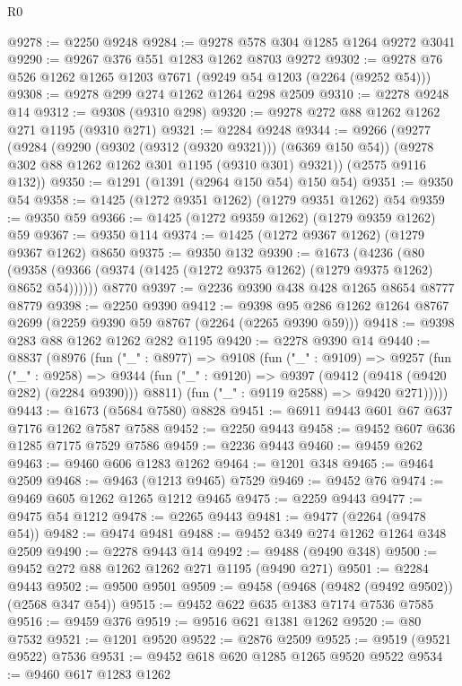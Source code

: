 \begin{lexlean}{R0}
\begin{coremodule}
@9278 := @2250 @9248
@9284 := @9278 @578 @304 @1285 @1264 @9272 @3041
@9290 := @9267 @376 @551 @1283 @1262 @8703 @9272
@9302 := @9278 @76 @526 @1262 @1265 @1203 @7671 (@9249 @54 @1203 (@2264 (@9252 @54)))
@9308 := @9278 @299 @274 @1262 @1264 @298 @2509
@9310 := @2278 @9248 @14
@9312 := @9308 (@9310 @298)
@9320 := @9278 @272 @88 @1262 @1262 @271 @1195 (@9310 @271)
@9321 := @2284 @9248
@9344 := @9266
    (@9277
      (@9284
        (@9290 (@9302 (@9312 (@9320 @9321))) (@6369 @150 @54))
        (@9278 @302 @88 @1262 @1262 @301 @1195 (@9310 @301) @9321))
      (@2575 @9116 @132))
@9350 := @1291 (@1391 (@2964 @150 @54) @150 @54)
@9351 := @9350 @54
@9358 := @1425 (@1272 @9351 @1262) (@1279 @9351 @1262) @54
@9359 := @9350 @59
@9366 := @1425 (@1272 @9359 @1262) (@1279 @9359 @1262) @59
@9367 := @9350 @114
@9374 := @1425 (@1272 @9367 @1262) (@1279 @9367 @1262) @8650
@9375 := @9350 @132
@9390 := @1673
    (@4236 (@80 (@9358 (@9366 (@9374 (@1425 (@1272 @9375 @1262) (@1279 @9375 @1262) @8652 @54))))))
    @8770
@9397 := @2236 @9390 @438 @428 @1265 @8654 @8777 @8779
@9398 := @2250 @9390
@9412 := @9398 @95 @286 @1262 @1264 @8767 @2699 (@2259 @9390 @59 @8767 (@2264 (@2265 @9390 @59)))
@9418 := @9398 @283 @88 @1262 @1262 @282 @1195
@9420 := @2278 @9390 @14
@9440 := @8837
    (@8976
      (fun ("_" : @8977) =>
      @9108
        (fun ("_" : @9109) =>
        @9257
          (fun ("_" : @9258) =>
          @9344
            (fun ("_" : @9120) => @9397 (@9412 (@9418 (@9420 @282) (@2284 @9390))) @8811)
            (fun ("_" : @9119 @2588) => @9420 @271)))))
@9443 := @1673 (@5684 @7580) @8828
@9451 := @6911 @9443 @601 @67 @637 @7176 @1262 @7587 @7588
@9452 := @2250 @9443
@9458 := @9452 @607 @636 @1285 @7175 @7529 @7586
@9459 := @2236 @9443
@9460 := @9459 @262
@9463 := @9460 @606 @1283 @1262
@9464 := @1201 @348
@9465 := @9464 @2509
@9468 := @9463 (@1213 @9465) @7529
@9469 := @9452 @76
@9474 := @9469 @605 @1262 @1265 @1212 @9465
@9475 := @2259 @9443
@9477 := @9475 @54 @1212
@9478 := @2265 @9443
@9481 := @9477 (@2264 (@9478 @54))
@9482 := @9474 @9481
@9488 := @9452 @349 @274 @1262 @1264 @348 @2509
@9490 := @2278 @9443 @14
@9492 := @9488 (@9490 @348)
@9500 := @9452 @272 @88 @1262 @1262 @271 @1195 (@9490 @271)
@9501 := @2284 @9443
@9502 := @9500 @9501
@9509 := @9458 (@9468 (@9482 (@9492 @9502)) (@2568 @347 @54))
@9515 := @9452 @622 @635 @1383 @7174 @7536 @7585
@9516 := @9459 @376
@9519 := @9516 @621 @1381 @1262
@9520 := @80 @7532
@9521 := @1201 @9520
@9522 := @2876 @2509
@9525 := @9519 (@9521 @9522) @7536
@9531 := @9452 @618 @620 @1285 @1265 @9520 @9522
@9534 := @9460 @617 @1283 @1262

\end{coremodule}
\end{lexlean}

